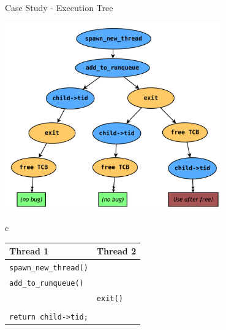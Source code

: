 \documentclass[xcolor=dvipsnames]{beamer}
\begin{document}
\begin{frame}{Case Study - Execution Tree}
	\begin{center}
		\includegraphics[width=0.7\textwidth]{threadfork.pdf}
		\hspace{-0.5in} {\tiny 
		\begin{tabular}{c}
			\begin{tabular}{|l|l|}
				\hline
				\cellcolor{thread1} {\bf Thread 1} & \cellcolor{thread2} {\bf Thread 2} \\
				\hline
				{\tt spawn\_new\_thread()} & \\
				\hline
				{\tt add\_to\_runqueue()} & \\
				\hline
				& {\tt exit()} \\
				\hline
				& {\tt <free TCB>} \\
				\hline
				{\tt return child->tid;} & \\
				\hline
			\end{tabular}
			\\ \\ \\ \\ \\ \\ \\ \\
			\\ \\ \\ \\ \\ \\ \\ \\
			\\ \\ \\ \\ \\ \\ \\ \\

\end{tabular}}
\end{center}
\end{frame}
\end{document}
